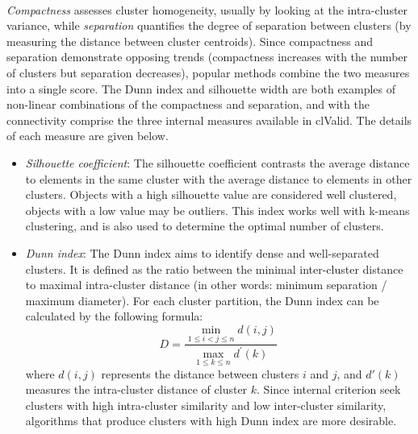 \documentclass[10pt]{article}\usepackage[]{graphicx}\usepackage[]{color}
\begin{document}
\paragraph{}
\textit{Compactness} assesses cluster homogeneity,
usually by looking at the intra-cluster variance, while \textit{separation} quantifies the degree of
separation between clusters (by measuring the distance between cluster centroids).
Since compactness and separation demonstrate opposing trends (compactness increases with
the number of clusters but separation decreases), popular methods combine the two measures
into a single score. The Dunn index and silhouette width are
both examples of non-linear combinations of the compactness and separation, and with the
connectivity comprise the three internal measures available in clValid. The details of each
measure are given below. 
\begin{itemize}
\item \textit{Silhouette coefficient}:
\newline \newline The silhouette coefficient contrasts the average distance to elements in the same cluster with the average distance to elements in other clusters. Objects with a high silhouette value are considered well clustered, objects with a low value may be outliers. This index works well with k-means clustering, and is also used to determine the optimal number of clusters. 

\item \textit{Dunn index}:
\newline \newline The Dunn index aims to identify dense and well-separated clusters. 
It is defined as the ratio between the minimal inter-cluster distance to maximal intra-cluster distance (in other words: minimum separation / maximum diameter). 
For each cluster partition, the Dunn index can be calculated by the following formula: 
$$D = \frac{\min_{1 \leq i < j \leq n} d(i,j)}{\max_{1 \leq k \leq n} d^{\prime}(k)} \,$$ 
where $d(i,j)$ represents the distance between clusters $i$ and $j$, and $d'(k)$ measures the intra-cluster distance of cluster $k$. 
\newline \newline
Since internal criterion seek clusters with high intra-cluster similarity and low inter-cluster similarity, algorithms that produce clusters with high Dunn index are more desirable.
\end{itemize}
\end{document}
